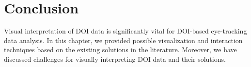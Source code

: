 \section{Conclusion}
Visual interpretation of DOI data is significantly vital for DOI-based eye-tracking data analysis. In this chapter, we provided possible visualization and interaction techniques based on the existing solutions in the literature. Moreover, we have discussed challenges for visually interpreting DOI data and their solutions. 
